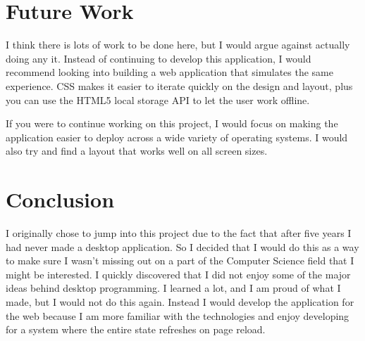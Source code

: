 \documentclass[10pt]{article}
\begin{document}
\section{Future Work}

I think there is lots of work to be done here, but I would argue against actually doing any it. Instead of continuing to develop this application, I would recommend looking into building a web application that simulates the same experience. CSS makes it easier to iterate quickly on the design and layout, plus you can use the HTML5 local storage API to let the user work offline.

If you were to continue working on this project, I would focus on making the application easier to deploy across a wide variety of operating systems. I would also try and find a layout that works well on all screen sizes.

\section{Conclusion}

I originally chose to jump into this project due to the fact that after five years I had never made a desktop application. So I decided that I would do this as a way to make sure I wasn't missing out on a part of the Computer Science field that I might be interested. I quickly discovered that I did not enjoy some of the major ideas behind desktop programming. I learned a lot, and I am proud of what I made, but I would not do this again. Instead I would develop the application for the web because I am more familiar with the technologies and enjoy developing for a system where the entire state refreshes on page reload.

\newpage
\singlespacing
{}
\nocite{*}


\end{document}
